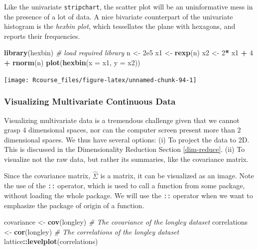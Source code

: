 \documentclass[]{book}
\newenvironment{Shaded}{\begin{snugshade}}{\end{snugshade}}
\newcommand{\KeywordTok}[1]{\textcolor[rgb]{0.13,0.29,0.53}{\textbf{#1}}}
\newcommand{\DataTypeTok}[1]{\textcolor[rgb]{0.13,0.29,0.53}{#1}}
\newcommand{\DecValTok}[1]{\textcolor[rgb]{0.00,0.00,0.81}{#1}}
\newcommand{\FloatTok}[1]{\textcolor[rgb]{0.00,0.00,0.81}{#1}}
\newcommand{\StringTok}[1]{\textcolor[rgb]{0.31,0.60,0.02}{#1}}
\newcommand{\CommentTok}[1]{\textcolor[rgb]{0.56,0.35,0.01}{\textit{#1}}}
\newcommand{\OperatorTok}[1]{\textcolor[rgb]{0.81,0.36,0.00}{\textbf{#1}}}
\newcommand{\NormalTok}[1]{#1}
\theoremstyle{definition}
\theoremstyle{definition}
\theoremstyle{definition}
\theoremstyle{remark}
\begin{document}
Like the univariate \texttt{stripchart}, the scatter plot will be an
uninformative mess in the presence of a lot of data. A nice bivariate
counterpart of the univariate histogram is the \emph{hexbin plot}, which
tessellates the plane with hexagons, and reports their frequencies.

\begin{Shaded}
\begin{Highlighting}[]
\KeywordTok{library}\NormalTok{(hexbin) }\CommentTok{# load required library}
\NormalTok{n <-}\StringTok{ }\FloatTok{2e5}
\NormalTok{x1 <-}\StringTok{ }\KeywordTok{rexp}\NormalTok{(n)}
\NormalTok{x2 <-}\StringTok{ }\DecValTok{2}\OperatorTok{*}\StringTok{ }\NormalTok{x1 }\OperatorTok{+}\StringTok{ }\DecValTok{4} \OperatorTok{+}\StringTok{ }\KeywordTok{rnorm}\NormalTok{(n)}
\KeywordTok{plot}\NormalTok{(}\KeywordTok{hexbin}\NormalTok{(}\DataTypeTok{x =}\NormalTok{ x1, }\DataTypeTok{y =}\NormalTok{ x2))}
\end{Highlighting}
\end{Shaded}

\texttt{[image: Rcourse\_files/figure-latex/unnamed-chunk-94-1]}

\subsubsection{Visualizing Multivariate Continuous
Data}\label{visualizing-multivariate-continuous-data}

Visualizing multivariate data is a tremendous challenge given that we
cannot grasp \(4\) dimensional spaces, nor can the computer screen
present more than \(2\) dimensional spaces. We thus have several
options: (i) To project the data to 2D. This is discussed in the
Dimensionality Reduction Section \ref{dim-reduce}. (ii) To visualize not
the raw data, but rather its summaries, like the covariance matrix.

Since the covariance matrix, \(\hat \Sigma\) is a matrix, it can be
visualized as an image. Note the use of the \texttt{::} operator, which
is used to call a function from some package, without loading the whole
package. We will use the \texttt{::} operator when we want to emphasize
the package of origin of a function.

\begin{Shaded}
\begin{Highlighting}[]
\NormalTok{covariance <-}\StringTok{ }\KeywordTok{cov}\NormalTok{(longley) }\CommentTok{# The covariance of the longley dataset}
\NormalTok{correlations <-}\StringTok{ }\KeywordTok{cor}\NormalTok{(longley) }\CommentTok{# The correlations of the longley dataset}
\NormalTok{lattice}\OperatorTok{::}\KeywordTok{levelplot}\NormalTok{(correlations)}
\end{Highlighting}
\end{Shaded}
\end{document}
